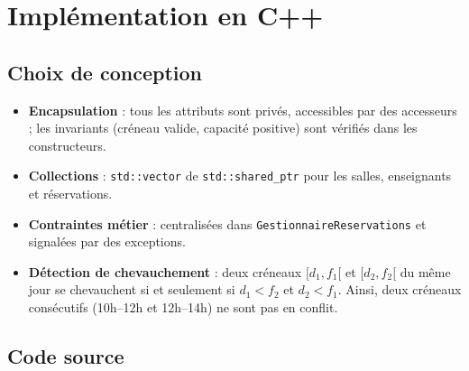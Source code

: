 \documentclass[12pt,a4paper]{report}
\begin{document}
\chapter{Implémentation en C++}

\section{Choix de conception}

\begin{itemize}
  \item \textbf{Encapsulation} : tous les attributs sont privés, accessibles par des accesseurs ; les invariants (créneau valide, capacité positive) sont vérifiés dans les constructeurs.
  \item \textbf{Collections} : \texttt{std::vector} de \texttt{std::shared\_ptr} pour les salles, enseignants et réservations.
  \item \textbf{Contraintes métier} : centralisées dans \texttt{GestionnaireReservations} et signalées par des exceptions.
  \item \textbf{Détection de chevauchement} : deux créneaux $[d_1, f_1[$ et $[d_2, f_2[$ du même jour se chevauchent si et seulement si $d_1 < f_2$ et $d_2 < f_1$. Ainsi, deux créneaux consécutifs (10h--12h et 12h--14h) ne sont pas en conflit.
\end{itemize}

\section{Code source}
\end{document}
